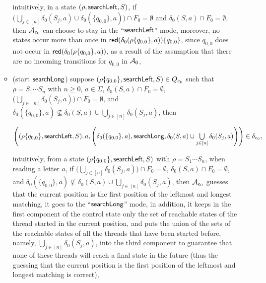 \begin{itemize}
\begin{itemize}
		\medskip
		 
		intuitively, in a state $(\rho, \mathsf{searchLeft}, S)$, if $\big(\bigcup \limits_{j \in [n]} \delta_0(S_j, a) \cup \delta_0(\{q_{0,0}\},a)\big) \cap F_0 = \emptyset$ and $\delta_0(S,a) \cap F_0 = \emptyset$, then $\mathcal{A}_{e_0}$ can choose to stay in the ``$\mathsf{searchLeft}$'' mode,
		moreover, no states occur more than once in $\mathsf{red}(\delta_0(\rho \{q_{0,0}\}, a)) \{q_{0,0}\}$, since $q_{0,0}$ does not occur in $\mathsf{red}(\delta_0(\rho\{q_{0,0}\}, a))$, as a result of the assumption that there are no incoming transitions for $q_{0,0}$ in $\mathcal{A}_0$,
		\item (start $\mathsf{searchLong}$) suppose $(\rho \{q_{0,0}\}, \mathsf{searchLeft}, S) \in Q_{e_0}$ such that $\rho = S_1 \cdots S_n$ with $n \ge 0$, $a \in \Sigma$, $\delta_0(S,a) \cap F_0 = \emptyset$, $\big(\bigcup \limits_{j \in [n]} \delta_0(S_j, a) \big) \cap F_0 = \emptyset$,  and $\delta_0(\{q_{0,0}\}, a) \not \subseteq \delta_0(S, a) \cup \bigcup \limits_{j \in [n]} \delta_0(S_j, a)$, then
		
		\medskip
		$\left((\rho \{q_{0,0}\}, \mathsf{searchLeft}, S), a, \left(\delta_0(\{q_{0,0}\}, a), \mathsf{searchLong}, \delta_0(S, a) \cup \bigcup \limits_{j \in [n]} \delta_0(S_j, a) \right) \right) \in \delta_{e_0},$
		
		\medskip
		intuitively, from a state $(\rho \{q_{0,0}\}, \mathsf{searchLeft}, S)$ with $\rho = S_1 \cdots S_n$, when reading a letter $a$, if $\big(\bigcup \limits_{j \in [n]} \delta_0(S_j, a) \big) \cap F_0 = \emptyset$, $\delta_0(S,a) \cap F_0 = \emptyset$, and $\delta_0(\{q_{0,0}\}, a) \not \subseteq \delta_0(S, a) \cup \bigcup \limits_{j \in [n]} \delta_0(S_j, a)$, then $\mathcal{A}_{e_0}$ guesses that the current position is the first position of the leftmost and longest matching, it goes to the ``$\mathsf{searchLong}$'' mode, in addition, it keeps in the first component of the control state only the set of reachable states of the thread started in the current position, and puts the union of the sets of the reachable states of all the threads that have been started before, namely, $\bigcup \limits_{j \in [n]} \delta_0(S_j, a)$, into the third component to guarantee that none of these threads will reach a final state in the future (thus the guessing that the current position is the first position of the leftmost and longest matching is correct),



\end{itemize}
\end{itemize}
